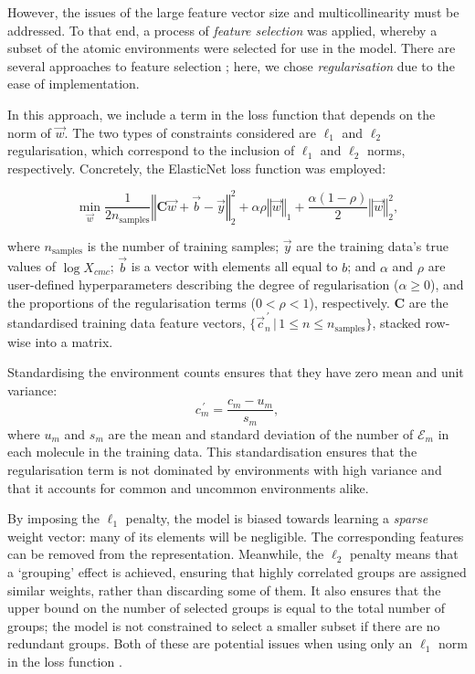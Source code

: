 However, the issues of the large feature vector size and multicollinearity must
be addressed. To that end, a process of \emph{feature selection} was applied,
whereby a subset of the atomic environments were selected for use in the model.
There are several approaches to feature selection
\cite{liFeatureSelectionData2017}; here, we chose \emph{regularisation} due to
the ease of implementation.

In this approach, we include a term in the loss function that depends on the
norm of $\vec{w}$. The two types of constraints considered are $\ell_1$ and
$\ell_2$ regularisation, which correspond to the inclusion of $\ell_1$ and
$\ell_2$ norms, respectively. Concretely, the ElasticNet
\cite{zouRegularizationVariableSelection2005} loss function was employed:

\begin{equation}
    \label{eq:elastic}
    \min_{\vec{w}} { \frac{1}{2n_{\text{samples}}} \left \Vert \mathbf{C}\vec{w} + \vec{b}- \vec{y} \right \Vert_2 ^ 2 + \alpha\rho \left \Vert \vec{w} \right \Vert_1} + \frac{\alpha(1 - \rho)}{2} \left \Vert \vec{w} \right \Vert_2^2,
\end{equation}

where $n_{\text{samples}}$ is the number of training samples; $\vec{y}$ are the
training data's true values of $\log X_{cmc}$; $\vec{b}$ is a vector with
elements all equal to $b$; and $\alpha$ and $\rho$ are user-defined
hyperparameters describing the degree of regularisation ($\alpha \geq 0$), and
the proportions of the regularisation terms ($0 < \rho < 1$), respectively.
$\mathbf{C}$ are the standardised training data feature vectors,
$\{\vec{c}^{\,\prime}_n \,|\, 1 \leq n \leq n_\text{samples}\}$, stacked
row-wise into a matrix.

Standardising the environment counts ensures that they have zero mean and unit variance:
\begin{equation}
    \label{eq:standard-scaling}
    {c}^{\,\prime}_m = \frac{c_m - u_m}{s_m},
\end{equation}
where $u_m$ and $s_m$ are the mean and standard deviation of the number of
$\mathcal{E}_m$ in each molecule in the training data. This standardisation
ensures that the regularisation term is not dominated by environments with high
variance and that it accounts for common and uncommon environments alike.

By imposing the $\ell_1$ penalty, the model is biased towards learning a
\emph{sparse} weight vector: many of its elements will be negligible. The
corresponding features can be removed from the representation. Meanwhile, the
$\ell_2$ penalty means that a `grouping' effect is achieved, ensuring that
highly correlated groups are assigned similar weights, rather than discarding
some of them. It also ensures that the upper bound on the number of selected
groups is equal to the total number of groups; the model is not constrained to
select a smaller subset if there are no redundant groups. Both of these are
potential issues when using only an $\ell_1$ norm in the loss function
\cite{efronLeastAngleRegression2004,zouRegularizationVariableSelection2005}.

